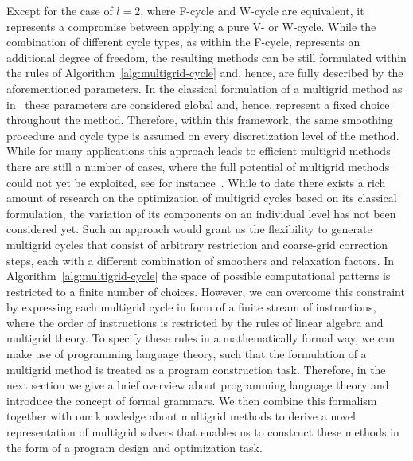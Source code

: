 Except for the case of $l = 2$, where F-cycle and W-cycle are equivalent, it represents a compromise between applying a pure V- or W-cycle.
While the combination of different cycle types, as within the F-cycle, represents an additional degree of freedom, the resulting methods can be still formulated within the rules of Algorithm~\ref{alg:multigrid-cycle} and, hence, are fully described by the aforementioned parameters.
In the classical formulation of a multigrid method as in~\cite{brandt1977multi,hackbusch2013multi,trottenberg2000multigrid,briggs2000multigrid} these parameters are considered global and, hence, represent a fixed choice throughout the method.
Therefore, within this framework, the same smoothing procedure and cycle type is assumed on every discretization level of the method.
While for many applications this approach leads to efficient multigrid methods~\cite{trottenberg2000multigrid} there are still a number of cases, where the full potential of multigrid methods could not yet be exploited, see for instance~\cite{ernst2012difficult,benzi2005numerical}.
While to date there exists a rich amount of research on the optimization of multigrid cycles based on its classical formulation, the variation of its components on an individual level has not been considered yet.
Such an approach would grant us the flexibility to generate multigrid cycles that consist of arbitrary restriction and coarse-grid correction steps, each with a different combination of smoothers and relaxation factors.
In Algorithm~\ref{alg:multigrid-cycle} the space of possible computational patterns is restricted to a finite number of choices. However, we can overcome this constraint by expressing each multigrid cycle in form of a finite stream of instructions, where the order of instructions is restricted by the rules of linear algebra and multigrid theory.
To specify these rules in a mathematically formal way, we can make use of programming language theory, such that the formulation of a multigrid method is treated as a program construction task.
Therefore, in the next section we give a brief overview about programming language theory and introduce the concept of formal grammars.
We then combine this formalism together with our knowledge about multigrid methods to derive a novel representation of multigrid solvers that enables us to construct these methods in the form of a program design and optimization task.


  


